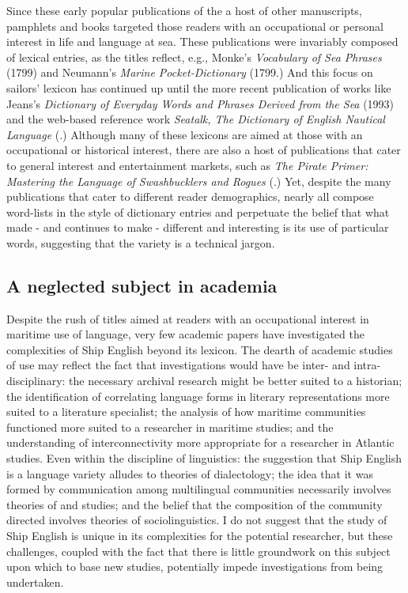 Since these early popular publications of the  a host of other manuscripts, pamphlets and books targeted those readers with an occupational or personal interest in life and language at sea. These publications were invariably composed of lexical entries, as the titles reflect, e.g., Monke’s \textit{Vocabulary of Sea Phrases} (1799) and Neumann’s \textit{Marine Pocket-Dictionary} (1799.) And this focus on sailors’ lexicon has continued up until the more recent publication of works like Jeans’s \textit{Dictionary of Everyday Words and Phrases Derived from the S}\textit{ea} (1993) and the web-based reference work \textit{Seatalk, The Dictionary of English Nautical Language} (\citealt{MacKenzie2005}.) Although many of these lexicons are aimed at those with an occupational or historical interest, there are also a host of publications that cater to general interest and entertainment markets, such as \textit{The Pirate Primer: Mastering the Language of Swashbucklers and Rogues} (\citealt{Choundas2007}.) Yet, despite the many publications that cater to different reader demographics, nearly all compose word-lists in the style of dictionary entries and perpetuate the belief that what made - and continues to make -  different and interesting is its use of particular words, suggesting that the variety is a technical jargon. 



\subsection{{A neglected subject in academia}}\label{sec:1.1.3}



Despite the rush of titles aimed at readers with an occupational interest in maritime use of language, very few academic papers have investigated the complexities of Ship English beyond its lexicon.  The dearth of academic studies of  use may reflect the fact that investigations would have be inter- and intra-disciplinary: the necessary archival research might be better suited to a historian; the identification of correlating language forms in literary representations more suited to a literature specialist; the analysis of how maritime communities functioned more suited to a researcher in maritime studies; and the understanding of interconnectivity more appropriate for a researcher in Atlantic studies. Even within the discipline of linguistics: the suggestion that Ship English is a language variety alludes to theories of dialectology; the idea that it was formed by communication among multilingual communities necessarily involves theories of  and  studies; and the belief that the composition of the community directed  involves theories of sociolinguistics. I do not suggest that the study of Ship English is unique in its complexities for the potential researcher, but these challenges, coupled with the fact that there is little groundwork on this subject upon which to base new studies, potentially impede investigations from being undertaken. 



